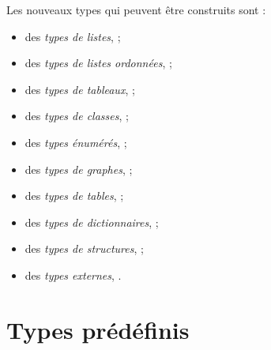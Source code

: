 
Les nouveaux types qui peuvent être construits sont :
\begin{itemize}
  \item des \emph{types de listes},  ;
  \item des \emph{types de listes ordonnées},  ;
  \item des \emph{types de tableaux},  ;
  \item des \emph{types de classes},  ;
  \item des \emph{types énumérés},  ;
  \item des \emph{types de graphes},  ;
  \item des \emph{types de tables},  ;
  \item des \emph{types de dictionnaires},  ;
  \item des \emph{types de structures},  ;
  \item des \emph{types externes}, .
\end{itemize}









\section{Types prédéfinis}

